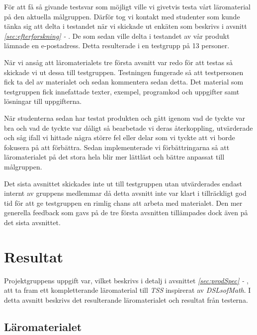 \documentclass[12pt,a4paper,twoside,openright]{article}
\begin{document}
För att få så givande testsvar som möjligt ville vi givetvis testa
vårt läromaterial på den aktuella målgruppen. Därför tog vi kontakt
med studenter som kunde tänka sig att delta i testandet när vi
skickade ut enkäten som beskrivs i avsnitt \textit{\ref{sec:efterforskning} -
}. De som
sedan ville delta i testandet av vår produkt lämnade en
e-postadress. Detta resulterade i en testgrupp på 13 personer.

När vi ansåg att läromaterialets tre första avsnitt var redo för att
testas så skickade vi ut dessa till testgruppen. Testningen fungerade så
att testpersonen fick ta del av materialet och sedan kommentera sedan detta. 
Det material som testgruppen fick innefattade texter, 
exempel, programkod och uppgifter samt
lösningar till uppgifterna.

När studenterna sedan har testat produkten och gått igenom vad de
tyckte var bra och vad de tyckte var dåligt så bearbetade vi deras
återkoppling, utvärderade och såg ifall vi hittade några större fel
eller delar som vi tyckte att vi borde fokusera på att
förbättra. Sedan implementerade vi förbättringarna så att
läromaterialet på det stora hela blir mer lättläst och bättre anpassat
till målgruppen.

Det sista avsnittet skickades inte ut till testgruppen utan
utvärderades endast internt av gruppens medlemmar då detta avsnitt
inte var klart i tillräckligt god tid för att ge testgruppen en rimlig
chans att arbeta med materialet. Den mer generella feedback som gavs
på de tre första avsnitten tillämpades dock även på det sista
avsnittet.

\section{Resultat}


%
Projektgruppens uppgift var, vilket beskrivs i detalj i avsnittet
\textit{\ref{sec:prodSpec} - }, att ta fram ett kompletterande
läromaterial till \textit{TSS} inspirerat av \textit{DSLsofMath}.
I detta avsnitt beskrivs det resulterande läromaterialet och
resultat från testerna.

\subsection{Läromaterialet}
\end{document}
